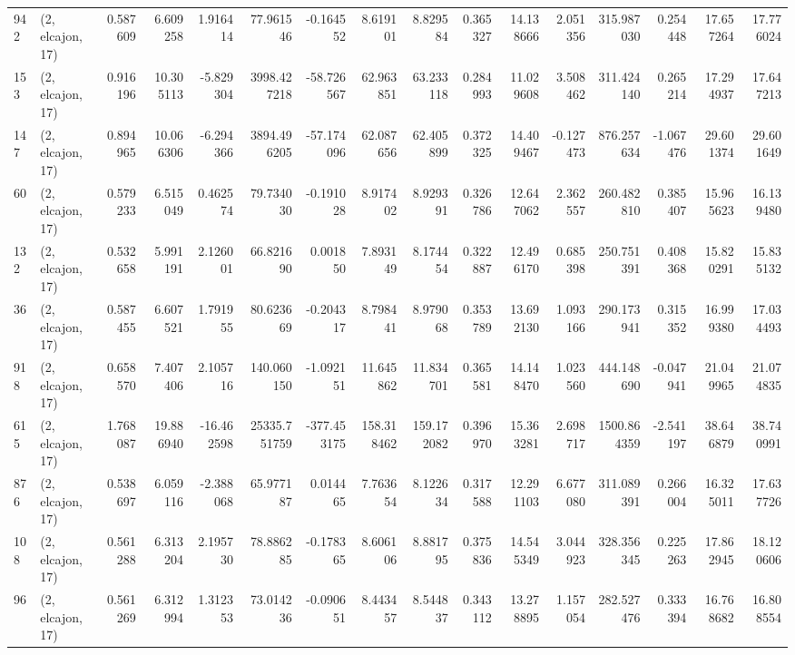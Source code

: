 \begin{tabular}{llrrrrrrrrrrrrrr}
942  &  (2, elcajon, 17) &   0.587609 &   6.609258 &   1.916414 &     77.961546 &   -0.164552 &    8.619101 &    8.829584 &  0.365327 &  14.138666 &   2.051356 &   315.987030 &   0.254448 &  17.657264 &  17.776024 \\
153  &  (2, elcajon, 17) &   0.916196 &  10.305113 &  -5.829304 &   3998.427218 &  -58.726567 &   62.963851 &   63.233118 &  0.284993 &  11.029608 &   3.508462 &   311.424140 &   0.265214 &  17.294937 &  17.647213 \\
147  &  (2, elcajon, 17) &   0.894965 &  10.066306 &  -6.294366 &   3894.496205 &  -57.174096 &   62.087656 &   62.405899 &  0.372325 &  14.409467 &  -0.127473 &   876.257634 &  -1.067476 &  29.601374 &  29.601649 \\
60   &  (2, elcajon, 17) &   0.579233 &   6.515049 &   0.462574 &     79.734030 &   -0.191028 &    8.917402 &    8.929391 &  0.326786 &  12.647062 &   2.362557 &   260.482810 &   0.385407 &  15.965623 &  16.139480 \\
132  &  (2, elcajon, 17) &   0.532658 &   5.991191 &   2.126001 &     66.821690 &    0.001850 &    7.893149 &    8.174454 &  0.322887 &  12.496170 &   0.685398 &   250.751391 &   0.408368 &  15.820291 &  15.835132 \\
36   &  (2, elcajon, 17) &   0.587455 &   6.607521 &   1.791955 &     80.623669 &   -0.204317 &    8.798441 &    8.979068 &  0.353789 &  13.692130 &   1.093166 &   290.173941 &   0.315352 &  16.999380 &  17.034493 \\
918  &  (2, elcajon, 17) &   0.658570 &   7.407406 &   2.105716 &    140.060150 &   -1.092151 &   11.645862 &   11.834701 &  0.365581 &  14.148470 &   1.023560 &   444.148690 &  -0.047941 &  21.049965 &  21.074835 \\
615  &  (2, elcajon, 17) &   1.768087 &  19.886940 & -16.462598 &  25335.751759 & -377.453175 &  158.318462 &  159.172082 &  0.396970 &  15.363281 &   2.698717 &  1500.864359 &  -2.541197 &  38.646879 &  38.740991 \\
876  &  (2, elcajon, 17) &   0.538697 &   6.059116 &  -2.388068 &     65.977187 &    0.014465 &    7.763654 &    8.122634 &  0.317588 &  12.291103 &   6.677080 &   311.089391 &   0.266004 &  16.325011 &  17.637726 \\
108  &  (2, elcajon, 17) &   0.561288 &   6.313204 &   2.195730 &     78.886285 &   -0.178365 &    8.606106 &    8.881795 &  0.375836 &  14.545349 &   3.044923 &   328.356345 &   0.225263 &  17.862945 &  18.120606 \\
96   &  (2, elcajon, 17) &   0.561269 &   6.312994 &   1.312353 &     73.014236 &   -0.090651 &    8.443457 &    8.544837 &  0.343112 &  13.278895 &   1.157054 &   282.527476 &   0.333394 &  16.768682 &  16.808554 \\

\end{tabular}
